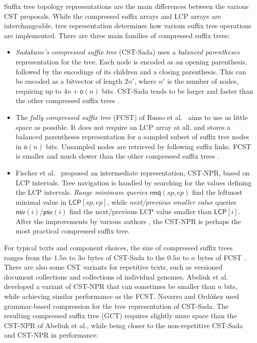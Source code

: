 \documentclass[a4paper,11pt]{llncs}
\newcommand{\CST}{\textsf{CST}}
\newcommand{\CSTsada}{\textsf{CST\nobreakdash-Sada}}
\newcommand{\GCT}{\textsf{GCT}}
\newcommand{\FCST}{\textsf{FCST}}
\newcommand{\CSTnpr}{\textsf{CST\nobreakdash-NPR}}
\newcommand{\LCP}{\textsf{LCP}}
\newcommand{\mLCP}{\ensuremath{\mathsf{LCP}}}
\newcommand{\mpsv}{\ensuremath{\mathsf{psv}}}
\newcommand{\mnsv}{\ensuremath{\mathsf{nsv}}}
\newcommand{\mrmq}{\ensuremath{\mathsf{rmq}}}
\newcommand{\oh}{\ensuremath{\mathsf{o}}}
\begin{document}
Suffix tree topology representations are the main differences between the
various \CST{} proposals. While the compressed suffix arrays and \LCP{} arrays
are interchangeable, tree representation determines how various suffix tree
operations are implemented. There are three main families of compressed suffix
trees:
\begin{itemize}
\item \emph{Sadakane's compressed suffix tree} (\CSTsada) \cite{Sadakane2007}
uses a \emph{balanced parentheses} representation for the tree. Each node is
encoded as an opening parenthesis, followed by the encodings of its children
and a closing parenthesis. This can be encoded as a bitvector of length $2n'$,
where $n'$ is the number of nodes, requiring up to $4n+\oh(n)$ bits.
\CSTsada{} tends to be larger and faster than the other compressed suffix
trees \cite{Gog2011a,Abeliuk2013}.
\item The \emph{fully compressed suffix tree} (\FCST) of Russo et
al.~\cite{Russo2011,Navarro2014a} aims to use as little space as possible. It
does not require an \LCP{} array at all, and stores a balanced parentheses
representation for a sampled subset of suffix tree nodes in $\oh(n)$ bits.
Unsampled nodes are retrieved by following suffix links. \FCST{} is smaller
and much slower than the other compressed suffix trees
\cite{Russo2011,Abeliuk2013}.
\item Fischer et al.~\cite{Fischer2009a} proposed an intermediate
representation, \CSTnpr, based on \LCP{} intervals. Tree navigation is handled
by searching for the values defining the \LCP{} intervals. \emph{Range minimum
queries} $\mrmq(sp,ep)$ find the leftmost minimal value in $\mLCP[sp,ep]$,
while \emph{next/previous smaller value} queries $\mnsv(i)$/$\mpsv(i)$ find
the next/previous \LCP{} value smaller than $\mLCP[i]$. After the improvements
by various authors \cite{Ohlebusch2009,Ohlebusch2010,Gog2011a,Abeliuk2013},
the \CSTnpr{} is perhaps the most practical compressed suffix tree.
\end{itemize}

For typical texts and component choices, the size of compressed suffix trees
ranges from the $1.5n$ to $3n$ bytes of \CSTsada{} to the $0.5n$ to $n$ bytes
of \FCST{} \cite{Gog2011a,Abeliuk2013}. There are also some \CST{} variants
for repetitive texts, such as versioned document collections and collections
of individual genomes. Abeliuk et al.~\cite{Abeliuk2013} developed a variant
of \CSTnpr{} that can sometimes be smaller than $n$ bits, while achieving
similar performance as the \FCST. Navarro and Ordóñez \cite{Navarro2014} used
grammar-based compression for the tree representation of \CSTsada. The
resulting compressed suffix tree (\GCT) requires slightly more space than the
\CSTnpr{} of Abeliuk et al., while being closer to the non-repetitive
\CSTsada{} and \CSTnpr{} in performance.
\end{document}
